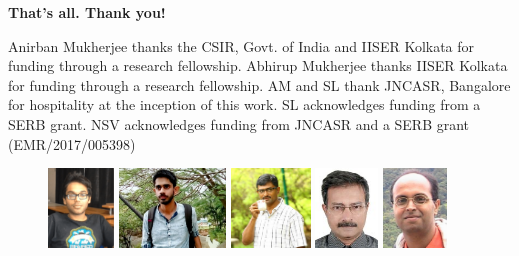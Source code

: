 \documentclass[aspectratio=169]{beamer}
\begin{document}
\begin{frame}[noframenumbering]{}

{\hspace*{\fill}\bf \Large That's all. Thank you! \hspace*{\fill}}

\vspace*{\fill}

Anirban Mukherjee thanks the CSIR, Govt. of India and IISER Kolkata for funding through a research fellowship. Abhirup Mukherjee thanks IISER Kolkata for funding through a research fellowship. AM and SL thank JNCASR, Bangalore for hospitality at the inception of this work. SL acknowledges funding from a SERB grant. NSV acknowledges funding from JNCASR and a SERB grant (EMR/2017/005398)

\vspace*{\fill}
\begin{figure}
	\hspace*{\fill}
	\includegraphics[height=60pt]{figures/am.png}
	\hspace*{\fill}
	\includegraphics[height=60pt]{figures/dp.jpg}
	\hspace*{\fill}
	\includegraphics[height=60pt]{figures/ns.jpeg}
	\hspace*{\fill}
	\includegraphics[height=60pt]{figures/arghyat.png}
	\hspace*{\fill}
	\includegraphics[height=60pt]{figures/slal.jpg}
	\hspace*{\fill}
\end{figure}
\end{frame}
\end{document}
